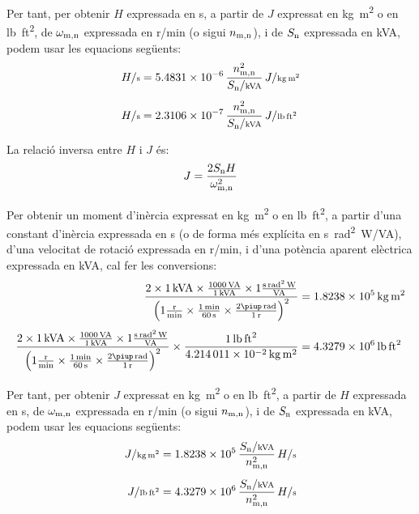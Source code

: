 Per tant, per  obtenir $H$ expressada en \si{s}, a partir de $J$  expressat en \si{kg.m^2} o en \si{lb.ft^2}, de $\omega\ped{m,n}$ expressada en \si{r/min} (o sigui $n\ped{m,n}$), i de $S\ped{n}$ expressada en \si{kVA}, podem usar les equacions següents:
\begin{subequations}
\begin{align}
    H/{\scriptstyle \si{s}} &= \num{5,4831e-6}\,  \frac{n\ped{m,n}^2}{S\ped{n}/{\scriptstyle \si{kVA}}} \, J/{\scriptstyle \si{kg.m^2}} \\[1ex]
    H/{\scriptstyle \si{s}} &= \num{2,3106e-7}\,  \frac{n\ped{m,n}^2}{S\ped{n}/{\scriptstyle \si{kVA}}} \, J/{\scriptstyle \si{lb.ft^2}}
\end{align}
\end{subequations}

La relació inversa entre $H$ i $J$ és:
\begin{equation}
    J = \frac{2 S\ped{n} H}{\omega\ped{m,n}^2}
\end{equation}

Per  obtenir un moment d'inèrcia expressat en \si{kg.m^2} o en \si{lb.ft^2}, a partir d'una constant d'inèrcia  expressada en \si{s} (o de forma més explícita en \si{s.rad^2.W/VA}), d'una velocitat de rotació expressada en \si{r/min}, i d'una potència aparent elèctrica expressada en \si{kVA}, cal  fer les conversions:
\begin{subequations}
\begin{align}
    \frac{2\times \SI{1}{kVA} \times \frac{\SI{1000}{VA}}{\SI{1}{kVA}} \times 1 \frac{\si{s.rad^2.W}}{\si{VA}}}{\left(1\frac{\si{r}}{\si{min}} \times \frac{\SI{1}{min}}{\SI{60}{s}} \times \frac{2\piup\,\si{rad}}{\SI{1}{r}}\right)^2}  &= \SI{1,8238e5}{kg.m^2} \\[1ex]
    \frac{2\times \SI{1}{kVA} \times \frac{\SI{1000}{VA}}{\SI{1}{kVA}} \times 1 \frac{\si{s.rad^2.W}}{\si{VA}}}{\left(1\frac{\si{r}}{\si{min}} \times \frac{\SI{1}{min}}{\SI{60}{s}} \times \frac{2\piup\,\si{rad}}{\SI{1}{r}}\right)^2}  \times \frac{\SI{1}{lb.ft^2}}{\SI{4,214011e-2}{kg.m^2}} &= \SI{4,3279e6}{lb.ft^2}
\end{align}
\end{subequations}

Per tant, per  obtenir $J$  expressat en \si{kg.m^2} o en \si{lb.ft^2}, a partir de $H$ expressada en \si{s}, de $\omega\ped{m,n}$ expressada en \si{r/min} (o sigui $n\ped{m,n}$), i de $S\ped{n}$ expressada en \si{kVA}, podem usar les equacions següents:
\begin{subequations}
\begin{align}
     J/{\scriptstyle \si{kg.m^2}} &= \num{1,8238e5}\,  \frac{S\ped{n}/{\scriptstyle \si{kVA}}}{n\ped{m,n}^2} \, H/{\scriptstyle \si{s}}\\[1ex]
    J/{\scriptstyle \si{lb.ft^2}} &= \num{4,3279e6}\,  \frac{S\ped{n}/{\scriptstyle \si{kVA}}}{n\ped{m,n}^2} \, H/{\scriptstyle \si{s}}
\end{align}
\end{subequations}


